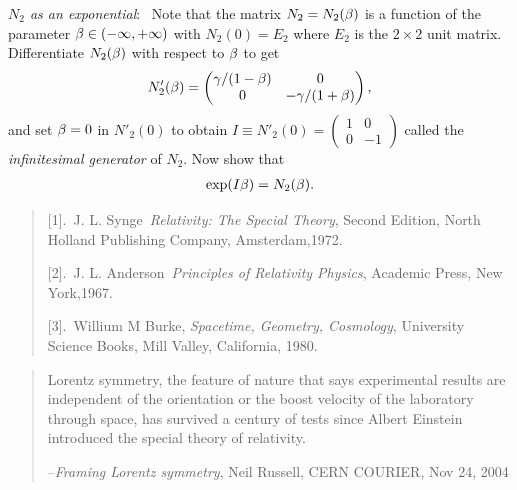 \begin{small}
\exise \textsl{$N_2$ as an exponential}:~
Note that the matrix $N_2= N_2({\beta})$ is a function of the
parameter ${\beta} \in (-\infty, +\infty)$ with $N_2(0)=E_2 $
where $E_2 $ is the $ 2\times 2 $ unit matrix. Differentiate
$N_2({\beta})$ with respect to $ {\beta}$ to get 
\begin{align*}
 N'_2({\beta})=\begin{pmatrix} 
{\gamma}/(1-{\beta})&0\\0&-{\gamma}/(1+{\beta})
\end{pmatrix},                                           
\end{align*}
and set $ {\beta} = 0$ in  $ N'_2(0)$ to obtain $I
\equiv N'_2(0) =\begin{pmatrix}1&0\\0&-1\end{pmatrix} $ 
called
the \textsl{infinitesimal generator} of $N_2$. Now show that
\begin{align}\label{str.81}
\exp(I{\beta})=N_2({\beta}).
\end{align}


\begin{quote}

[1].~J. L. Synge~\textit{Relativity: The Special Theory}, 
Second Edition, North Holland Publishing Company, 
Amsterdam,1972.


[2].~J. L. Anderson~\textit{Principles of Relativity 
Physics}, Academic Press, New York,1967.

[3].~Willium M Burke, \textit{Spacetime, Geometry, 
Cosmology}, University Science Books, Mill Valley, 
California, 1980.\end{quote}\end{small}

\begin{quote}
Lorentz symmetry, the feature of nature that says 
experimental results are independent of the orientation or 
the boost velocity of the laboratory through space, has 
survived a century of tests since Albert Einstein 
introduced 
the special theory of relativity.

--\textsl{Framing Lorentz symmetry}, Neil Russell, CERN 
\break COURIER, Nov 24, 2004
\end{quote}

